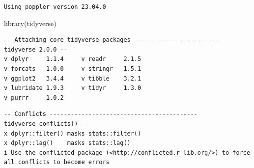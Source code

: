 \documentclass[
  letterpaper,
  DIV=11,
  numbers=noendperiod]{scrartcl}
\newenvironment{Shaded}{\begin{snugshade}}{\end{snugshade}}
\newcommand{\FunctionTok}[1]{\textcolor[rgb]{0.28,0.35,0.67}{#1}}
\newcommand{\NormalTok}[1]{\textcolor[rgb]{0.00,0.23,0.31}{#1}}
\begin{document}
\begin{verbatim}
Using poppler version 23.04.0
\end{verbatim}

\begin{Shaded}
\begin{Highlighting}[]
\FunctionTok{library}\NormalTok{(tidyverse)}
\end{Highlighting}
\end{Shaded}

\begin{verbatim}
-- Attaching core tidyverse packages ------------------------ tidyverse 2.0.0 --
v dplyr     1.1.4     v readr     2.1.5
v forcats   1.0.0     v stringr   1.5.1
v ggplot2   3.4.4     v tibble    3.2.1
v lubridate 1.9.3     v tidyr     1.3.0
v purrr     1.0.2     
\end{verbatim}

\begin{verbatim}
-- Conflicts ------------------------------------------ tidyverse_conflicts() --
x dplyr::filter() masks stats::filter()
x dplyr::lag()    masks stats::lag()
i Use the conflicted package (<http://conflicted.r-lib.org/>) to force all conflicts to become errors
\end{verbatim}
\end{document}
